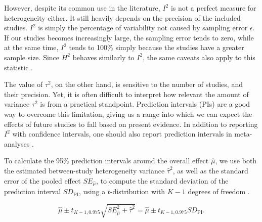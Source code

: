 \documentclass[../../../main.tex]{subfiles}
\begin{document}
However, despite its common use in the literature, $I^2$ is not a perfect measure for heterogeneity either. It still heavily depends on the precision of the included studies. $I^2$ is simply the percentage of variability not caused by sampling error $\epsilon$. If our studies becomes increasingly large, the sampling error tends to zero, while at the same time, $I^2$ tends to 100\% simply because the studies have a greater sample size. Since $H^2$ behaves similarly to $I^2$, the same caveats also apply to this statistic \autocite{Harrer2021}.

The value of $\tau^2$, on the other hand, is sensitive to the number of studies, and their precision. Yet, it is often difficult to interpret how relevant the amount of variance $\tau^2$ is from a practical standpoint. Prediction intervals (PIs) are a good way to overcome this limitation, giving us a range into which we can expect the effects of future studies to fall based on present evidence. In addition to reporting $I^2$ with confidence intervals, one should also report prediction intervals in meta-analyses \autocite{Harrer2021}.

To calculate the 95\% prediction intervals around the overall effect $\hat{\mu}$, we use both the estimated between-study heterogeneity variance $\hat{\tau}^2$, as well as the standard error of the pooled effect $SE_{\hat{\mu}}$, to compute the standard deviation of the prediction interval $SD_\text{PI}$, using a $t$-distribution with $K-1$ degrees of freedom \autocite{Harrer2021}.

\begin{equation}
\hat{\mu} \pm t_{K-1,0.975}\sqrt{SE_{\hat{\mu}}^2+\hat{\tau}^2} = \hat{\mu} \pm t_{K-1,0.975}SD_\text{PI}.
\end{equation}
\end{document}
